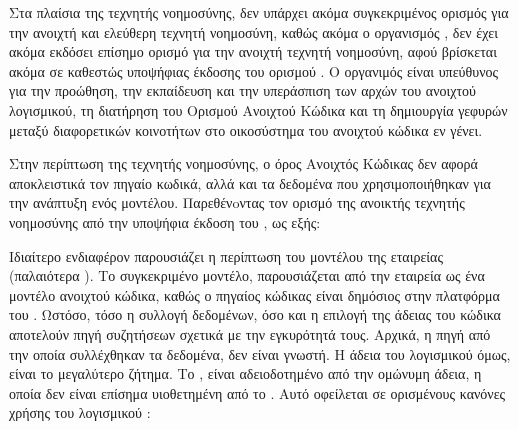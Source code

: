 Στα πλαίσια της τεχνητής νοημοσύνης, δεν υπάρχει ακόμα συγκεκριμένος
ορισμός για την ανοιχτή και ελεύθερη τεχνητή νοημοσύνη, καθώς ακόμα ο
οργανισμός , δεν έχει ακόμα εκδόσει επίσημο
ορισμό για την ανοιχτή τεχνητή νοημοσύνη, αφού βρίσκεται ακόμα σε
καθεστώς υποψήφιας
έκδοσης του ορισμού 
\cite{OpenSourceAIDefinition}. O οργανιμός 
είναι υπεύθυνος
για την προώθηση, την εκπαίδευση και την υπεράσπιση των αρχών του
ανοιχτού λογισμικού, τη διατήρηση του Ορισμού Ανοιχτού Κώδικα και τη
δημιουργία γεφυρών μεταξύ διαφορετικών κοινοτήτων στο οικοσύστημα του
ανοιχτού κώδικα εν γένει.

Στην περίπτωση της τεχνητής νοημοσύνης, ο όρος Ανοιχτός Κώδικας δεν
αφορά αποκλειστικά τον πηγαίο κωδικά, αλλά και τα δεδομένα που
χρησιμοποιήθηκαν για την ανάπτυξη ενός μοντέλου.
Παρεθένoντας τον ορισμό της ανοικτής τεχνητής νοημοσύνης από την
υποψήφια έκδοση του , ως εξής:


Ιδιαίτερο ενδιαφέρον παρουσιάζει η περίπτωση του μοντέλου  της
εταιρείας  (παλαιότερα )\cite{llama}.
Το συγκεκριμένο μοντέλο, παρουσιάζεται από την εταιρεία  ως
ένα μοντέλο ανοιχτού κώδικα, καθώς ο πηγαίος κώδικας είναι δημόσιος
στην πλατφόρμα του .
Ωστόσο, τόσο η συλλογή δεδομένων, όσο και η επιλογή της άδειας του
κώδικα αποτελούν πηγή συζητήσεων σχετικά με την εγκυρότητά τους.
Αρχικά, η πηγή από την οποία συλλέχθηκαν τα δεδομένα, δεν είναι
γνωστή. \cite{llama3}
Η άδεια του λογισμικού όμως, είναι το μεγαλύτερο ζήτημα. Το , είναι αδειοδοτημένο από την ομώνυμη άδεια, η οποία δεν είναι
επίσημα υιοθετημένη από το . Αυτό οφείλεται
σε ορισμένους κανόνες χρήσης του λογισμικού \cite{llamalicense}:

